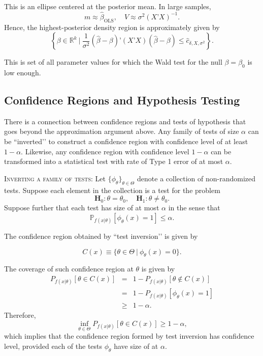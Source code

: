 \documentclass[11pt]{article} %
\begin{document}
\noindent This is an ellipse centered at the posterior mean. In large samples, 
$$ m \approx \widehat{\beta}_{\textrm{OLS}}, \quad V \approx \sigma^2 (X’X)^{-1}.$$
Hence, the highest-posterior density region is approximately given by 
\[ \left \{ \beta \in \mathbb{R}^{k} \: \Big | \:  \frac{1}{\sigma^2}(\widehat{\beta} - \beta) ’(X’X)  (\widehat{\beta} - \beta)  \leq \widehat{c}_{\delta,X,\sigma^2} \right \}. \]

\noindent This is set of all parameter values for which the Wald test for the null $\beta = \beta_0$ is low enough. 

\subsection{Confidence Regions and Hypothesis Testing}
There is a connection between confidence regions and tests of hypothesis that goes beyond the approximation argument above. Any family of tests of size $\alpha$ can be ``inverted’’ to construct a confidence region with confidence level of at least $1-\alpha$. Likewise, any confidence region with confidence level $1-\alpha$ can be transformed into a statistical test with rate of Type 1 error of at most $\alpha$. 

{\scshape Inverting a family of tests:} Let $\{\phi_{\theta}\}_{\theta \in \Theta}$ denote a collection of non-randomized tests. Suppose each element in the collection is a test for the problem
\[ \mathbf{H}_0: \theta =\theta_0, \quad \mathbf{H}_1: \theta \neq \theta_0. \]
Suppose further that each test has size of at most $\alpha$ in the sense that
\[ \mathbb{P}_{f(x|\theta)} [\phi_{\theta}(x)=1] \leq \alpha. \]

\noindent The confidence region obtained by ``test inversion’’ is given by

\[ C  (x) \equiv \{ \theta \in \Theta \: | \: \phi_{\theta}(x)=0\}. \]

\noindent The coverage of such confidence region at $\theta$ is given by
\begin{eqnarray*}
P_{f(x|\theta)} [\theta \in C(x)] &=& 1-P_{f(x|\theta)} [\theta \notin C(x)]  \\
&=& 1- P_{f(x|\theta)} [ \phi_{\theta}(x) = 1] \\
& \geq & 1-\alpha.   
\end{eqnarray*}
\noindent Therefore, 
\[\inf_{\theta \in \Theta} P_{f(x|\theta)} [\theta \in C(x)] \geq 1-\alpha,   \]
\noindent which implies that the confidence region formed by test inversion has confidence level, provided each of the tests $\phi_{\theta}$ have size of at $\alpha$. \\
\end{document}
